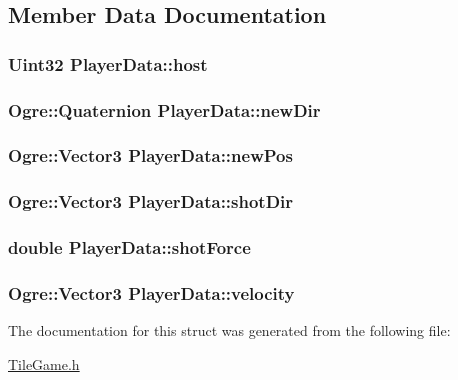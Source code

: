\subsection{Member Data Documentation}
\hypertarget{structPlayerData_afedaac99a073198e7347fb41df68bbdf}{
\subsubsection[{host}]{\setlength{\rightskip}{0pt plus 5cm}Uint32 Player\-Data\-::host}}\label{structPlayerData_afedaac99a073198e7347fb41df68bbdf}
\hypertarget{structPlayerData_a1ba2a05ce9b43b34334163b84e975c4b}{
\subsubsection[{new\-Dir}]{\setlength{\rightskip}{0pt plus 5cm}Ogre\-::\-Quaternion Player\-Data\-::new\-Dir}}\label{structPlayerData_a1ba2a05ce9b43b34334163b84e975c4b}
\hypertarget{structPlayerData_ab63193631eb26d16924e7b81aab109be}{
\subsubsection[{new\-Pos}]{\setlength{\rightskip}{0pt plus 5cm}Ogre\-::\-Vector3 Player\-Data\-::new\-Pos}}\label{structPlayerData_ab63193631eb26d16924e7b81aab109be}
\hypertarget{structPlayerData_acab3f24dcc83136321f31dd719fb855e}{
\subsubsection[{shot\-Dir}]{\setlength{\rightskip}{0pt plus 5cm}Ogre\-::\-Vector3 Player\-Data\-::shot\-Dir}}\label{structPlayerData_acab3f24dcc83136321f31dd719fb855e}
\hypertarget{structPlayerData_a793f89049e5fbf15cefe903487a56265}{
\subsubsection[{shot\-Force}]{\setlength{\rightskip}{0pt plus 5cm}double Player\-Data\-::shot\-Force}}\label{structPlayerData_a793f89049e5fbf15cefe903487a56265}
\hypertarget{structPlayerData_a3c4941ad4f202eca640b912e25a67a9f}{
\subsubsection[{velocity}]{\setlength{\rightskip}{0pt plus 5cm}Ogre\-::\-Vector3 Player\-Data\-::velocity}}\label{structPlayerData_a3c4941ad4f202eca640b912e25a67a9f}


The documentation for this struct was generated from the following file\-:\begin{DoxyCompactItemize}
\item 
\hyperlink{TileGame_8h}{Tile\-Game.\-h}\end{DoxyCompactItemize}
